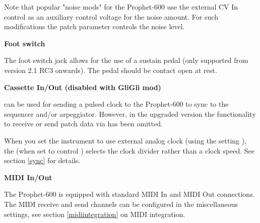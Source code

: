 Note that popular "noise mods" for the Prophet-600 use the external CV In control as an auxiliary control voltage for the noise amount. For such modifications the patch parameter controls the noise level.

\textbf{Foot switch}

The foot switch jack allows for the use of a sustain pedal (only supported from version 2.1 RC3 onwards). The pedal should be contact open at rest.

\textbf{Cassette In/Out (disabled with GliGli mod)}

\cassettein can be used for sending a pulsed clock to the Prophet-600 to sync to the sequencer and/or arpeggiator. However, in the upgraded version the functionality to receive or send patch data via \cassettein has been omitted. 

When you set the instrument to use external analog clock (using the setting \clocksync), the \datadial (when set to control \clock) selects the clock divider rather than a clock speed. See section \ref{sync} for details.

\textbf{MIDI In/Out}

The Prophet-600 is equipped with standard MIDI In and MIDI Out connections. The MIDI receive and send channels can be configured in the miscellaneous settings, see section \ref{midiintegration} on MIDI integration.  
